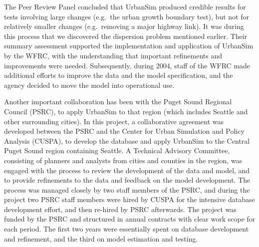 The Peer Review Panel concluded that UrbanSim produced credible
results for tests involving large changes (e.g.\ the urban growth
boundary test), but not for relatively smaller changes (e.g.\
removing a major highway link).  It was during this process that we
discovered the dispersion problem mentioned earlier. Their summary
assessment supported the implementation and application of UrbanSim
by the WFRC, with the understanding that important refinements and
improvements were needed.  Subsequently, during 2004, staff of the
WFRC made additional efforts to improve the data and the model
specification, and the agency decided to move the model into
operational use.

Another important collaboration has been with the Puget Sound
Regional Council (PSRC), to apply UrbanSim to that region (which
includes Seattle and other surrounding cities).  In this project, a
collaborative agreement was developed between the PSRC and the
Center for Urban Simulation and Policy Analysis (CUSPA), to develop
the database and apply UrbanSim to the Central Puget Sound region
containing Seattle.  A Technical Advisory Committee, consisting of
planners and analysts from cities and counties in the region, was
engaged with the process to review the development of the data and
model, and to provide refinements to the data and feedback on the
model development.  The process was managed closely by two staff
members of the PSRC, and during the project two PSRC staff members
were hired by CUSPA for the intensive database development effort,
and then re-hired by PSRC afterwards.  The project was funded by the
PSRC and structured in annual contracts with clear work scope for
each period.  The first two years were essentially spent on database
development and refinement, and the third on model estimation and
testing.

